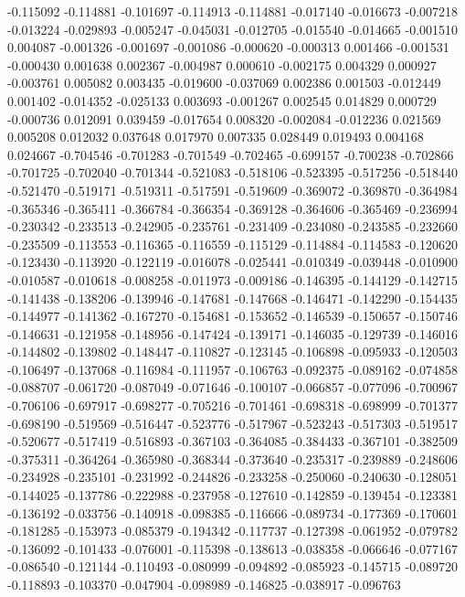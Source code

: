 -0.115092
-0.114881
-0.101697
-0.114913
-0.114881
-0.017140
-0.016673
-0.007218
-0.013224
-0.029893
-0.005247
-0.045031
-0.012705
-0.015540
-0.014665
-0.001510
0.004087
-0.001326
-0.001697
-0.001086
-0.000620
-0.000313
0.001466
-0.001531
-0.000430
0.001638
0.002367
-0.004987
0.000610
-0.002175
0.004329
0.000927
-0.003761
0.005082
0.003435
-0.019600
-0.037069
0.002386
0.001503
-0.012449
0.001402
-0.014352
-0.025133
0.003693
-0.001267
0.002545
0.014829
0.000729
-0.000736
0.012091
0.039459
-0.017654
0.008320
-0.002084
-0.012236
0.021569
0.005208
0.012032
0.037648
0.017970
0.007335
0.028449
0.019493
0.004168
0.024667
-0.704546
-0.701283
-0.701549
-0.702465
-0.699157
-0.700238
-0.702866
-0.701725
-0.702040
-0.701344
-0.521083
-0.518106
-0.523395
-0.517256
-0.518440
-0.521470
-0.519171
-0.519311
-0.517591
-0.519609
-0.369072
-0.369870
-0.364984
-0.365346
-0.365411
-0.366784
-0.366354
-0.369128
-0.364606
-0.365469
-0.236994
-0.230342
-0.233513
-0.242905
-0.235761
-0.231409
-0.234080
-0.243585
-0.232660
-0.235509
-0.113553
-0.116365
-0.116559
-0.115129
-0.114884
-0.114583
-0.120620
-0.123430
-0.113920
-0.122119
-0.016078
-0.025441
-0.010349
-0.039448
-0.010900
-0.010587
-0.010618
-0.008258
-0.011973
-0.009186
-0.146395
-0.144129
-0.142715
-0.141438
-0.138206
-0.139946
-0.147681
-0.147668
-0.146471
-0.142290
-0.154435
-0.144977
-0.141362
-0.167270
-0.154681
-0.153652
-0.146539
-0.150657
-0.150746
-0.146631
-0.121958
-0.148956
-0.147424
-0.139171
-0.146035
-0.129739
-0.146016
-0.144802
-0.139802
-0.148447
-0.110827
-0.123145
-0.106898
-0.095933
-0.120503
-0.106497
-0.137068
-0.116984
-0.111957
-0.106763
-0.092375
-0.089162
-0.074858
-0.088707
-0.061720
-0.087049
-0.071646
-0.100107
-0.066857
-0.077096
-0.700967
-0.706106
-0.697917
-0.698277
-0.705216
-0.701461
-0.698318
-0.698999
-0.701377
-0.698190
-0.519569
-0.516447
-0.523776
-0.517967
-0.523243
-0.517303
-0.519517
-0.520677
-0.517419
-0.516893
-0.367103
-0.364085
-0.384433
-0.367101
-0.382509
-0.375311
-0.364264
-0.365980
-0.368344
-0.373640
-0.235317
-0.239889
-0.248606
-0.234928
-0.235101
-0.231992
-0.244826
-0.233258
-0.250060
-0.240630
-0.128051
-0.144025
-0.137786
-0.222988
-0.237958
-0.127610
-0.142859
-0.139454
-0.123381
-0.136192
-0.033756
-0.140918
-0.098385
-0.116666
-0.089734
-0.177369
-0.170601
-0.181285
-0.153973
-0.085379
-0.194342
-0.117737
-0.127398
-0.061952
-0.079782
-0.136092
-0.101433
-0.076001
-0.115398
-0.138613
-0.038358
-0.066646
-0.077167
-0.086540
-0.121144
-0.110493
-0.080999
-0.094892
-0.085923
-0.145715
-0.089720
-0.118893
-0.103370
-0.047904
-0.098989
-0.146825
-0.038917
-0.096763
